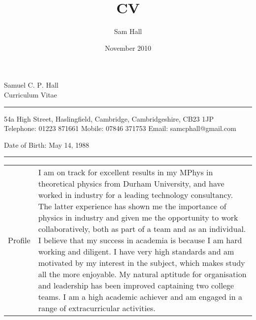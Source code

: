 \documentclass[11pt,a4paper]{article}
\title{CV}
\author{Sam Hall}
\date{November 2010}
\makeatletter
\newcommand{\wa}{.12}	%
\newcommand{\wb}{.83}	%
\newenvironment{tablehere}
	{\def\@captype{table}}
	{}
\makeatother
\begin{document}
\begin{center}
	\sc\LARGE Samuel C$.$ P$.$ Hall\\
	\large Curriculum Vitae
	\vspace{0.4cm}\hrule
\end{center}

\begin{center}
	\sc 54a High Street, Haslingfield, Cambridge, Cambridgeshire, CB23 1JP\\
	\sc Telephone: 01223 871661\;\;  Mobile: 07846 371753\;\;  Email: \rm samcphall@gmail.com
	
	\sc Date of Birth: May 14, 1988
\end{center}


\vspace{0.2cm}\hrule\vspace{0.2cm}

\begin{tablehere}
\begin{tabular}{p{\wa\textwidth} p{\wb\textwidth}}
	\sc Profile	&	
	I am on track for excellent results in my MPhys in theoretical physics from Durham University, and have worked in industry for a leading technology consultancy.  The latter experience has shown me the importance of physics in industry and given me the opportunity to work collaboratively, both as part of a team and as an individual.  I believe that my success in academia is because I am hard working and diligent.  I have very high standards and am motivated by my interest in the subject, which makes study all the more enjoyable.  My natural aptitude for organisation and leadership has been improved captaining two college teams.  I am a high academic achiever and am engaged in a range of extracurricular activities.
	
	
	
\end{tabular}
\end{tablehere}
\end{document}
